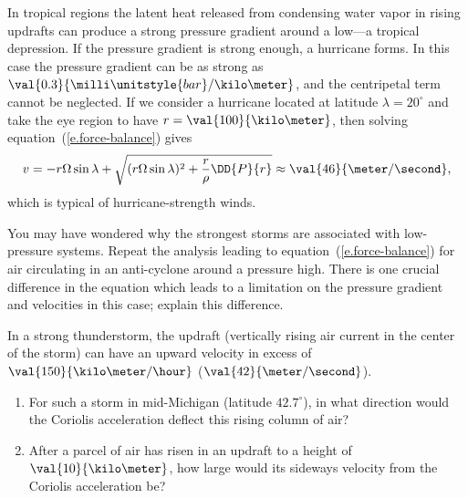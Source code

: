 In tropical regions the latent heat released from condensing water vapor in rising updrafts can produce a strong pressure gradient around a low---a tropical depression. If the pressure gradient is strong enough, a hurricane forms. In this case the pressure gradient can be as strong as $\val{0.3}{\milli\unitstyle{bar}/\kilo\meter}$, and the centripetal term cannot be neglected.
If we consider a hurricane located at  latitude $\lambda=20^{\circ}$ and take the eye region to have $r = \val{100}{\kilo\meter}$, then solving equation~(\ref{e.force-balance}) gives
\[
	v = -r\Omega\sin\lambda + \sqrt{(r\Omega\sin\lambda)^{2}+\frac{r}{\rho}\DD{P}{r}}\approx \val{46}{\meter/\second},
\]
which is typical of hurricane-strength winds.

\begin{exercisebox}
You may have wondered why the strongest storms are associated with low-pressure systems. Repeat the analysis leading to equation~(\ref{e.force-balance}) for air circulating in an anti-cyclone around a pressure high. There is one crucial difference in the equation which leads to a limitation on the pressure gradient and velocities in this case; explain this difference.
\end{exercisebox}

\begin{exercisebox}
In a strong thunderstorm, the updraft (vertically rising air current in the center of the storm) can have an upward velocity in excess of $\val{150}{\kilo\meter/\hour}$ ($\val{42}{\meter/\second}$). 
\begin{enumerate}
\item
For such a storm in mid-Michigan (latitude $42.7^{\circ}$), in what direction would the Coriolis acceleration deflect this rising column of air?
\item
After a parcel of air has risen in an updraft to a height of $\val{10}{\kilo\meter}$, how large would its sideways velocity from the Coriolis acceleration be?
\end{enumerate}
\end{exercisebox}